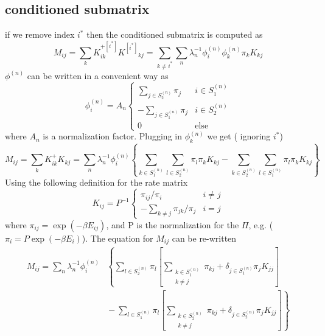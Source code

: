 \documentclass[a4paper]{article}
\newcommand{\evec}[2]{\phi^{(#2)}_{#1}}
\newcommand{\subK}{K^{[i^{*}]}}
\begin{document}
\subsection{conditioned submatrix}
if we remove index $i^{*}$ then the conditioned submatrix is computed as
\begin{equation}
M_{ij} = \sum_{k} K^{+[i^{*}]}_{ik} \subK{}_{kj}  = 
\sum_{k \ne i^{*}} \sum_n \lambda_n^{-1} \evec{i}{n} \evec{k}{n} \pi_k K_{kj}
\end{equation}
$\phi^{(n)}$ can be written in a convenient way as
\begin{equation}
\evec{i}{n} = A_n
\begin{cases}
 \sum_{j \in S^{(n)}_2} \pi_{j} & i \in S^{(n)}_1 \\
-\sum_{j \in S^{(n)}_1} \pi_{j} & i \in S^{(n)}_2 \\
0 & \text{else}
\end{cases}
\end{equation}
where $A_n$ is a normalization factor.  Plugging in $\evec{k}{n}$ we get ({\color{red} ignoring $i^{*}$})
\begin{equation}
M_{ij} = \sum_{k} K^{+}_{ik} K_{kj}  = 
\sum_n \lambda_n^{-1} \evec{i}{n} \left\{ 
  \sum_{k \in S_1^{(n)}} 
  \sum_{l \in S_2^{(n)}} 
  \pi_l
  \pi_k K_{kj}
  -
  \sum_{k \in S_2^{(n)}} 
  \sum_{l \in S_1^{(n)}} 
  \pi_l
  \pi_k K_{kj}
\right\}
\end{equation}
Using the following definition for the rate matrix 
\begin{equation}
K_{ij} = P^{-1}
\begin{cases}
 \pi_{ij} / \pi_i & i \ne j \\
-\sum_{k \ne j} \pi_{jk} / \pi_j & i = j
\end{cases}
\end{equation}
where $\pi_{ij} = \exp (-\beta E_{ij})$, and P is the normalization for the $\Pi$, e.g. ($\pi_i = P \exp (-\beta E_i)$).
The equation for $M_{ij}$ can be re-written
\begin{align}
M_{ij} = 
\sum_n \lambda_n^{-1} \evec{i}{n} 
& \left\{ 
  \sum_{l \in S_2^{(n)}}   \pi_l
  \left[
  \sum_{\substack{k \in S_1^{(n)} \\ k \ne j}} 
  \pi_{kj}
   + \delta_{j \in S_1^{(n)}}
   \pi_j K_{jj}
  \right]
  \right. \\ & \left. 
  {} - \sum_{l \in S_1^{(n)}} \pi_l
  \left[
  \sum_{\substack{k \in S_2^{(n)} \\ k \ne j}} 
  \pi_{kj}
   + \delta_{j \in S_2^{(n)}}
   \pi_j K_{jj}
  \right]
\right\}
\end{align}
\end{document}

